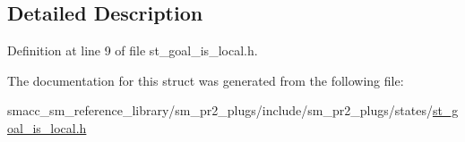 \subsection{Detailed Description}


Definition at line 9 of file st\+\_\+goal\+\_\+is\+\_\+local.\+h.



The documentation for this struct was generated from the following file\+:\begin{DoxyCompactItemize}
\item 
smacc\+\_\+sm\+\_\+reference\+\_\+library/sm\+\_\+pr2\+\_\+plugs/include/sm\+\_\+pr2\+\_\+plugs/states/\hyperlink{st__goal__is__local_8h}{st\+\_\+goal\+\_\+is\+\_\+local.\+h}\end{DoxyCompactItemize}
